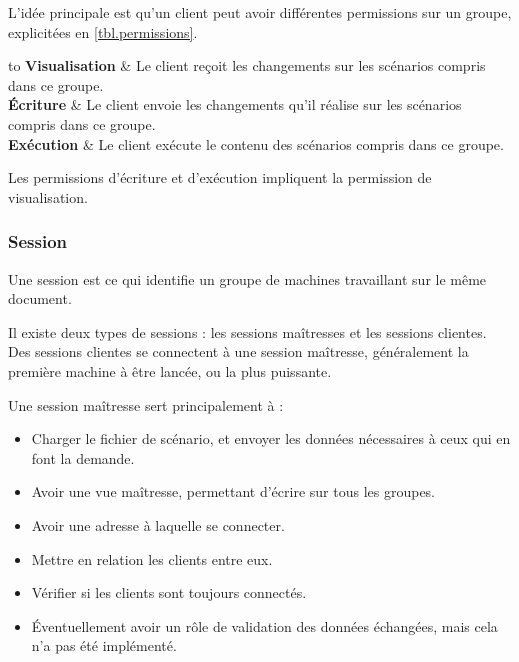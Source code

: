 L'idée principale est qu'un client peut avoir différentes permissions sur un groupe, explicitées en \cref{tbl.permissions}.

\begin{table}[H]
	\centering
	
	\begin{tabu} to \linewidth{XX[4,m]}
		\textbf{Visualisation} & Le client reçoit les changements sur les scénarios compris dans ce groupe. \\ \midrule
		\textbf{Écriture} & Le client envoie les changements qu'il réalise sur les scénarios compris dans ce groupe. \\ \midrule 
		\textbf{Exécution} & Le client exécute le contenu des scénarios compris dans ce groupe. \\
	\end{tabu}
	
	\caption{Explication des permissions possibles}
	\label{tbl.permissions}
\end{table}

Les permissions d'écriture et d'exécution impliquent la permission de visualisation.

\subsubsection{Session}
Une session est ce qui identifie un groupe de machines travaillant sur le même document.

Il existe deux types de sessions : les sessions maîtresses et les sessions clientes.
Des sessions clientes se connectent à une session maîtresse, généralement la première machine à être lancée, ou la plus puissante.

Une session maîtresse sert principalement à : 
\begin{itemize}
	\item Charger le fichier de scénario, et envoyer les données nécessaires à ceux qui en font la demande.
	\item Avoir une vue maîtresse, permettant d'écrire sur tous les groupes.
	\item Avoir une adresse à laquelle se connecter.
	\item Mettre en relation les clients entre eux.
	\item Vérifier si les clients sont toujours connectés.
	\item Éventuellement avoir un rôle de validation des données échangées, mais cela n'a pas été implémenté.
\end{itemize}

